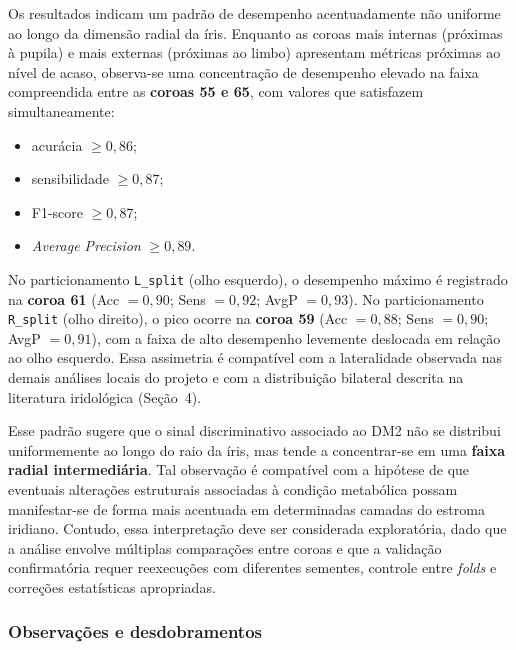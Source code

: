 \documentclass[11pt,a4paper]{article}
\begin{document}
Os resultados indicam um padrão de desempenho acentuadamente não uniforme ao longo da dimensão radial da íris. Enquanto as coroas mais internas (próximas à pupila) e mais externas (próximas ao limbo) apresentam métricas próximas ao nível de acaso, observa-se uma concentração de desempenho elevado na faixa compreendida entre as \textbf{coroas 55 e 65}, com valores que satisfazem simultaneamente:
\begin{itemize}
    \item acurácia $\geq 0{,}86$;
    \item sensibilidade $\geq 0{,}87$;
    \item F1-score $\geq 0{,}87$;
    \item \textit{Average Precision} $\geq 0{,}89$.
\end{itemize}

No particionamento \texttt{L\_split} (olho esquerdo), o desempenho máximo é registrado na \textbf{coroa 61} (Acc $= 0{,}90$; Sens $= 0{,}92$; AvgP $= 0{,}93$). No particionamento \texttt{R\_split} (olho direito), o pico ocorre na \textbf{coroa 59} (Acc $= 0{,}88$; Sens $= 0{,}90$; AvgP $= 0{,}91$), com a faixa de alto desempenho levemente deslocada em relação ao olho esquerdo. Essa assimetria é compatível com a lateralidade observada nas demais análises locais do projeto e com a distribuição bilateral descrita na literatura iridológica (Seção~4).

Esse padrão sugere que o sinal discriminativo associado ao DM2 não se distribui uniformemente ao longo do raio da íris, mas tende a concentrar-se em uma \textbf{faixa radial intermediária}. Tal observação é compatível com a hipótese de que eventuais alterações estruturais associadas à condição metabólica possam manifestar-se de forma mais acentuada em determinadas camadas do estroma iridiano. Contudo, essa interpretação deve ser considerada exploratória, dado que a análise envolve múltiplas comparações entre coroas e que a validação confirmatória requer reexecuções com diferentes sementes, controle entre \textit{folds} e correções estatísticas apropriadas.

\subsubsection{Observações e desdobramentos}
\end{document}

